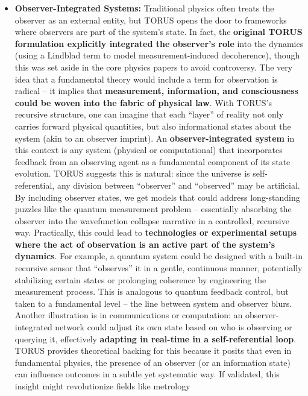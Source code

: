 \begin{itemize}
\item
  \textbf{Observer-Integrated Systems:} Traditional physics often treats
  the observer as an external entity, but TORUS opens the door to
  frameworks where observers are part of the system's state. In fact,
  the \textbf{original TORUS formulation explicitly integrated the
  observer's role} into the dynamics (using a Lindblad term to model
  measurement-induced decoherence), though this was set aside in the
  core physics papers to avoid controversy​. The very idea that a
  fundamental theory would include a term for observation is radical --
  it implies that \textbf{measurement, information, and consciousness
  could be woven into the fabric of physical law}. With TORUS's
  recursive structure, one can imagine that each ``layer'' of reality
  not only carries forward physical quantities, but also informational
  states about the system (akin to an observer imprint). An
  \textbf{observer-integrated system} in this context is any system
  (physical or computational) that incorporates feedback from an
  observing agent as a fundamental component of its state evolution.
  TORUS suggests this is natural: since the universe is
  self-referential, any division between ``observer'' and ``observed''
  may be artificial. By including observer states, we get models that
  could address long-standing puzzles like the quantum measurement
  problem -- essentially absorbing the observer into the wavefunction
  collapse narrative in a controlled, recursive way​. Practically, this
  could lead to \textbf{technologies or experimental setups where the
  act of observation is an active part of the system's dynamics}. For
  example, a quantum system could be designed with a built-in recursive
  sensor that ``observes'' it in a gentle, continuous manner,
  potentially stabilizing certain states or prolonging coherence by
  engineering the measurement process. This is analogous to quantum
  feedback control, but taken to a fundamental level -- the line between
  system and observer blurs. Another illustration is in communications
  or computation: an observer-integrated network could adjust its own
  state based on who is observing or querying it, effectively
  \textbf{adapting in real-time in a self-referential loop}. TORUS
  provides theoretical backing for this because it posits that even in
  fundamental physics, the presence of an observer (or an information
  state) can influence outcomes in a subtle yet systematic way. If
  validated, this insight might revolutionize fields like metrology

\end{itemize}
